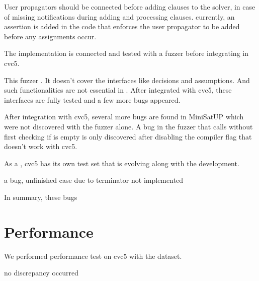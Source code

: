 User propagators should be connected before adding clauses to the solver, in case of missing notifications during adding and processing clauses.
currently, an assertion is added in the code that enforces the user propagator to be added before any assignments occur.

The implementation is connected and tested with a fuzzer before integrating in cvc5.

This fuzzer . It doesn't cover the interfaces like decisions and assumptions. And such functionalities are not essential in . After integrated with cvc5, these interfaces are fully tested and a few more bugs appeared.


After integration with cvc5, several more bugs are found in MiniSatUP which were not discovered with the fuzzer alone. A bug in the fuzzer that calls  without first checking if  is empty is only discovered after disabling the compiler flag  that doesn't work with cvc5.

As a , cvc5 has its own test set that is evolving along with the development.

a bug, unfinished case due to terminator not implemented


In summary, these bugs 

\section{Performance}


We performed performance test on cvc5 with the dataset.


no discrepancy occurred
